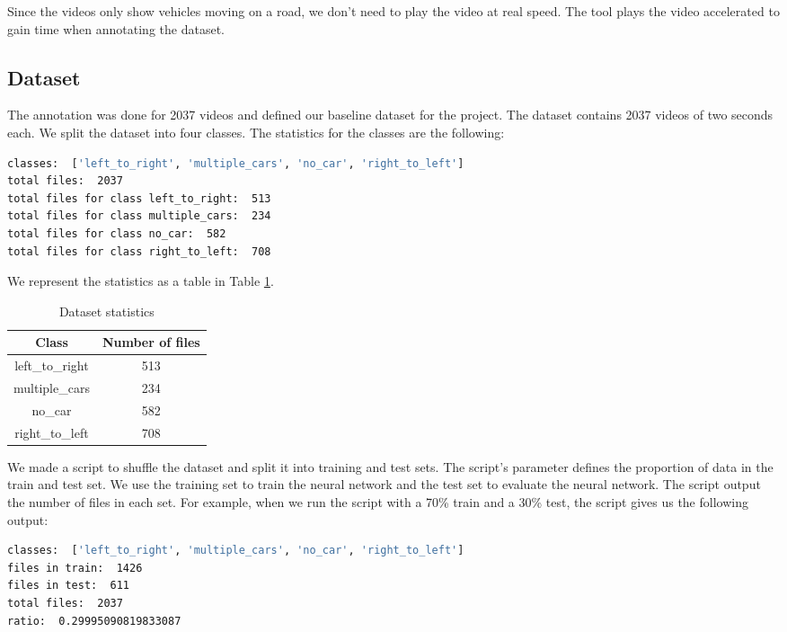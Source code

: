 Since the videos only show vehicles moving on a road, we don't need to play the video at real speed. The tool plays the video accelerated to gain time when annotating the dataset. 

\subsection{Dataset}

The annotation was done for 2037 videos and defined our baseline dataset for the project. The dataset contains 2037 videos of two seconds each. We split the dataset into four classes. The statistics for the classes are the following:

\begin{lstlisting}[language=bash]
classes:  ['left_to_right', 'multiple_cars', 'no_car', 'right_to_left']
total files:  2037
total files for class left_to_right:  513
total files for class multiple_cars:  234
total files for class no_car:  582
total files for class right_to_left:  708
\end{lstlisting}

We represent the statistics as a table in Table \ref{tab:dataset_statistics}.

\begin{table}[H]
    \centering
    \begin{tabular}{|c|c|}
        \hline
        \textbf{Class} & \textbf{Number of files} \\
        \hline
        left\_to\_right & 513 \\
        \hline
        multiple\_cars & 234 \\
        \hline
        no\_car & 582 \\
        \hline
        right\_to\_left & 708 \\
        \hline
    \end{tabular}
    \caption{Dataset statistics}
    \label{tab:dataset_statistics}
\end{table}

We made a script to shuffle the dataset and split it into training and test sets. The script's parameter defines the proportion of data in the train and test set. We use the training set to train the neural network and the test set to evaluate the neural network. The script output the number of files in each set. For example, when we run the script with a 70\% train and a 30\% test, the script gives us the following output:

\begin{lstlisting}[language=bash]
classes:  ['left_to_right', 'multiple_cars', 'no_car', 'right_to_left']
files in train:  1426
files in test:  611
total files:  2037
ratio:  0.29995090819833087
\end{lstlisting}

